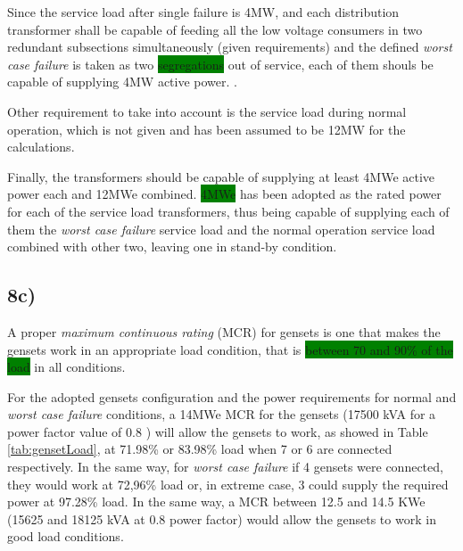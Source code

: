 Since the service load after single failure is 4MW, and each distribution transformer shall be capable of feeding all the low voltage consumers in two redundant subsections  simultaneously (given requirements) and the defined \textit{worst case failure} is taken as two \colorbox{green}{segregations} out of service, each of them shouls be capable of supplying 4MW active power. .

Other requirement to take into account is the service load during normal operation, which is not given and has been assumed to be 12MW for the calculations.

Finally, the transformers should be capable of supplying at least 4MWe active power each and 12MWe combined. \colorbox{green}{4MWe} has been adopted as the rated power for each of the service load transformers, thus being capable of supplying each of them the \textit{worst case failure} service load and the normal operation service load combined with other two, leaving one in stand-by condition.




\subsection*{8c)}

A proper \textit{maximum continuous rating} (MCR) for gensets is one that makes the gensets work in an appropriate load condition, that is \colorbox{green}{between 70 and 90\% of the load}  in all conditions.

For the adopted gensets configuration and the power requirements for normal and \textit{worst case failure} conditions, a 14MWe MCR for the gensets (17500 kVA for a power factor value of 0.8 \cite{CatGenerators}) will allow the gensets to work, as showed in Table \ref{tab:gensetLoad}, at 71.98\% or 83.98\% load when 7 or 6 are connected respectively. In the same way, for \textit{worst case failure} if 4 gensets were connected, they would work at 72,96\% load or, in extreme case, 3 could supply the required power at 97.28\% load. In the same way, a MCR between 12.5 and 14.5 KWe (15625 and 18125 kVA at 0.8 power factor) would allow the gensets to work in good load conditions. 

